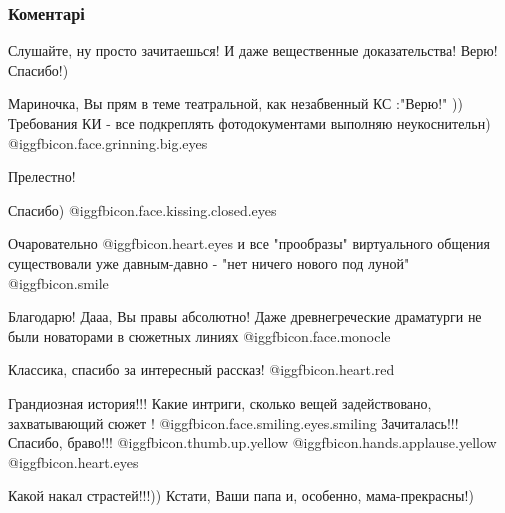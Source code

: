  
 
 
 
 
\subsubsection{Коментарі}

\begin{itemize} %
Слушайте, ну просто зачитаешься! И даже вещественные доказательства! Верю! Спасибо!)

\begin{itemize} %

Мариночка, Вы прям в теме театральной, как незабвенный КС :"Верю!" ))
Требования КИ - все подкреплять фотодокументами выполняю неукоснительн) @igg{fbicon.face.grinning.big.eyes} 

\end{itemize} %

Прелестно!

Спасибо) @igg{fbicon.face.kissing.closed.eyes} 

Очаровательно @igg{fbicon.heart.eyes}  и все "прообразы" виртуального общения существовали уже давным-давно - "нет ничего нового под луной" @igg{fbicon.smile} 

\begin{itemize} %
Благодарю! Дааа, Вы правы абсолютно! Даже древнегреческие драматурги не были новаторами в сюжетных линиях @igg{fbicon.face.monocle} 

Классика, спасибо за интересный рассказ! @igg{fbicon.heart.red}
\end{itemize} %

Грандиозная история!!! Какие интриги, сколько вещей задействовано, захватывающий сюжет !  @igg{fbicon.face.smiling.eyes.smiling} Зачиталась!!! Спасибо, браво!!!  @igg{fbicon.thumb.up.yellow}  @igg{fbicon.hands.applause.yellow}  @igg{fbicon.heart.eyes} 

Какой накал страстей!!!)) Кстати, Ваши папа и, особенно, мама-прекрасны!)


\end{itemize}
